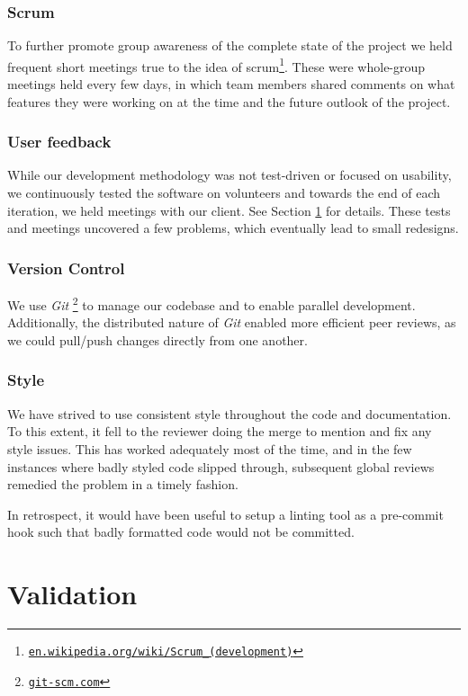 \documentclass[a4paper,11pt,titlepage]{article}
\let\stdhref\href
\renewcommand{\href}[2]{\stdhref{#1}{\texttt{#2}}}
\let\stdsection\section         %
\renewcommand{\section}{\newpage\stdsection}
\newcommand{\buzz}[1]{\emph{#1}}
\newcommand{\myhref}[1]{\href{http://#1}{#1}}
\newcommand{\Git}{\buzz{Git} }
\begin{document}
\subsubsection{Scrum}
To further promote group awareness of the complete state of the
project we held frequent short meetings true to the idea of
scrum\footnote{\myhref{en.wikipedia.org/wiki/Scrum\_(development)}}.
These were whole-group meetings held every few days, in which team
members shared comments on what features they were working on at the
time and the future outlook of the project.

\subsubsection{User feedback}
While our development methodology was not test-driven or focused on
usability, we continuously tested the software on volunteers and
towards the end of each iteration, we held meetings with our
client. See Section \ref{validation} for details. These tests and
meetings uncovered a few problems, which eventually lead to small
redesigns.

\subsubsection{Version Control}
We use \Git\footnote{\myhref{git-scm.com}} to manage our
codebase and to enable parallel development. Additionally, the
distributed nature of \Git enabled more efficient peer reviews, as we
could pull/push changes directly from one another.

\subsubsection{Style}
We have strived to use consistent style throughout the code and
documentation. To this extent, it fell to the reviewer doing the merge
to mention and fix any style issues. This has worked adequately most
of the time, and in the few instances where badly styled code slipped
through, subsequent global reviews remedied the problem in a timely
fashion.

In retrospect, it would have been useful to setup a linting tool as a
pre-commit hook such that badly formatted code would not be committed.

\section{Validation}
\label{validation}
\end{document}
